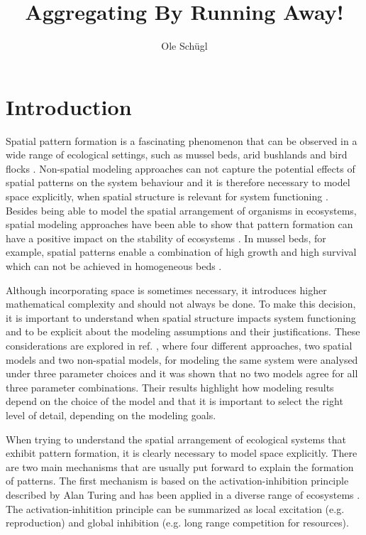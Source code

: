 \documentclass{article}
\title{Aggregating By Running Away!}
\author{Ole Schügl}
\begin{document}
\maketitle

\section{Introduction}
Spatial pattern formation is a fascinating phenomenon that can be observed in a wide range of ecological settings, such as mussel beds, arid bushlands and bird flocks \autocite{liuPhaseSeparationDriven2016,rietkerkSelfOrganizationVegetationArid}.
Non-spatial modeling approaches can not capture the potential effects of spatial patterns on the system behaviour and it is therefore necessary to model space explicitly, when spatial structure is relevant for system functioning \cite{durrettImportanceBeingDiscrete1994}.
Besides being able to model the spatial arrangement of organisms in ecosystems, spatial modeling approaches have been able to show that pattern formation can have a positive impact on the stability of ecosystems \cite{durrettImportanceBeingDiscrete1994, vandekoppelExperimentalEvidenceSpatial2008,rietkerkEvasionTippingComplex2021,liuPatternFormationMultiple2014}. 
In mussel beds, for example, spatial patterns enable a combination of high growth and high survival which can not be achieved in homogeneous beds \autocite{vandekoppelExperimentalEvidenceSpatial2008}.

Although incorporating space is sometimes necessary, it introduces higher mathematical complexity and should not always be done.
To make this decision, it is important to understand when spatial structure impacts system functioning and to be explicit about the modeling assumptions and their justifications.
These considerations are explored in ref. \cite{durrettImportanceBeingDiscrete1994}, where four different approaches, two spatial models and two non-spatial models, for modeling the same system were analysed under three parameter choices and it was shown that no two models agree for all three parameter combinations.
Their results highlight how modeling results depend on the choice of the model and that it is important to select the right level of detail, depending on the modeling goals.

When trying to understand the spatial arrangement of ecological systems that exhibit pattern formation, it is clearly necessary to model space explicitly.
There are two main mechanisms that are usually put forward to explain the formation of patterns.
The first mechanism is based on the activation-inhibition principle described by Alan Turing \autocite{turingChemicalBasisMorphogenesis1952} and has been applied in a diverse range of ecosystems \autocite{rietkerkRegularPatternFormation2008}.
The activation-inhitition principle can be summarized as local excitation (e.g. reproduction) and global inhibition (e.g. long range competition for resources).
\end{document}
